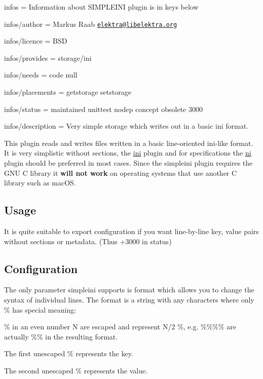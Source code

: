 
\begin{DoxyItemize}
\item infos = Information about S\+I\+M\+P\+L\+E\+I\+NI plugin is in keys below
\item infos/author = Markus Raab \href{mailto:elektra@libelektra.org}{\tt elektra@libelektra.\+org}
\item infos/licence = B\+SD
\item infos/provides = storage/ini
\item infos/needs = code null
\item infos/placements = getstorage setstorage
\item infos/status = maintained unittest nodep concept obsolete 3000
\item infos/description = Very simple storage which writes out in a basic ini format.
\end{DoxyItemize}

This plugin reads and writes files written in a basic line-\/oriented ini-\/like format. It is very simplistic without sections, the \hyperlink{md_src_plugins_ini_README_src_plugins_ini_README_md}{ini} plugin and for specifications the \hyperlink{md_src_plugins_ni_README_src_plugins_ni_README_md}{ni} plugin should be preferred in most cases. Since the {\ttfamily simpleini} plugin requires the G\+NU C library it {\bfseries will not work} on operating systems that use another C library such as mac\+OS.

\subsection*{Usage}

It is quite suitable to export configuration if you want line-\/by-\/line key, value pairs without sections or metadata. (Thus +3000 in status) 


\subsection*{Configuration}

The only parameter simpleini supports is {\ttfamily format} which allows you to change the syntax of individual lines. The {\ttfamily format} is a string with any characters where only {\ttfamily \%} has special meaning\+:


\begin{DoxyItemize}
\item {\ttfamily \%} in an even number N are escaped and represent N/2 {\ttfamily \%}, e.\+g. {\ttfamily \%\%\%\%} are actually {\ttfamily \%\%} in the resulting format.
\item The first unescaped {\ttfamily \%} represents the key.
\item The second unescaped {\ttfamily \%} represents the value.
\end{DoxyItemize}

